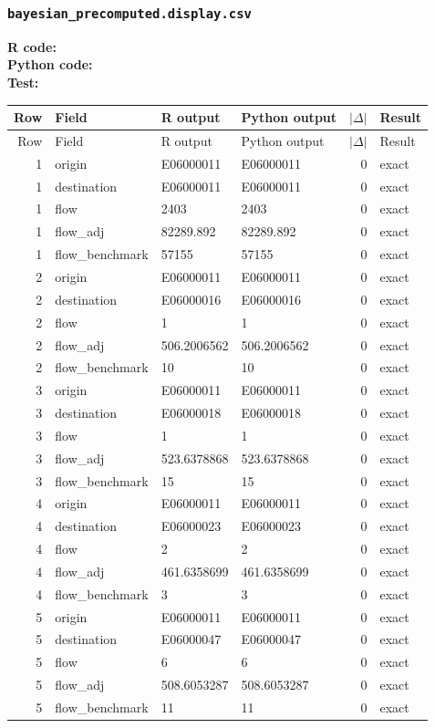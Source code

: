 \documentclass[10pt]{article}
\begin{document}
\subsubsection{\texorpdfstring{\texttt{bayesian\_precomputed.display.csv}}{bayesian\_precomputed.display.csv}}
{\footnotesize \textbf{R code:} \\ \textbf{Python code:} \\ \textbf{Test:} \par}

\small
\begin{longtable}{@{}r p{}p{}p{}rl@{}}
\toprule
Row & Field & R output & Python output & $|\Delta|$ & Result \\
\midrule
\endfirsthead
\toprule
Row & Field & R output & Python output & $|\Delta|$ & Result \\
\midrule
\endhead
1 & origin & E06000011 & E06000011 & 0 & exact \\
1 & destination & E06000011 & E06000011 & 0 & exact \\
1 & flow & 2403 & 2403 & 0 & exact \\
1 & flow\_\allowbreak{}adj & 82289.892 & 82289.892 & 0 & exact \\
1 & flow\_\allowbreak{}benchmark & 57155 & 57155 & 0 & exact \\
2 & origin & E06000011 & E06000011 & 0 & exact \\
2 & destination & E06000016 & E06000016 & 0 & exact \\
2 & flow & 1 & 1 & 0 & exact \\
2 & flow\_\allowbreak{}adj & 506.2006562 & 506.2006562 & 0 & exact \\
2 & flow\_\allowbreak{}benchmark & 10 & 10 & 0 & exact \\
3 & origin & E06000011 & E06000011 & 0 & exact \\
3 & destination & E06000018 & E06000018 & 0 & exact \\
3 & flow & 1 & 1 & 0 & exact \\
3 & flow\_\allowbreak{}adj & 523.6378868 & 523.6378868 & 0 & exact \\
3 & flow\_\allowbreak{}benchmark & 15 & 15 & 0 & exact \\
4 & origin & E06000011 & E06000011 & 0 & exact \\
4 & destination & E06000023 & E06000023 & 0 & exact \\
4 & flow & 2 & 2 & 0 & exact \\
4 & flow\_\allowbreak{}adj & 461.6358699 & 461.6358699 & 0 & exact \\
4 & flow\_\allowbreak{}benchmark & 3 & 3 & 0 & exact \\
5 & origin & E06000011 & E06000011 & 0 & exact \\
5 & destination & E06000047 & E06000047 & 0 & exact \\
5 & flow & 6 & 6 & 0 & exact \\
5 & flow\_\allowbreak{}adj & 508.6053287 & 508.6053287 & 0 & exact \\
5 & flow\_\allowbreak{}benchmark & 11 & 11 & 0 & exact \\
\bottomrule
\end{longtable}
\end{document}
